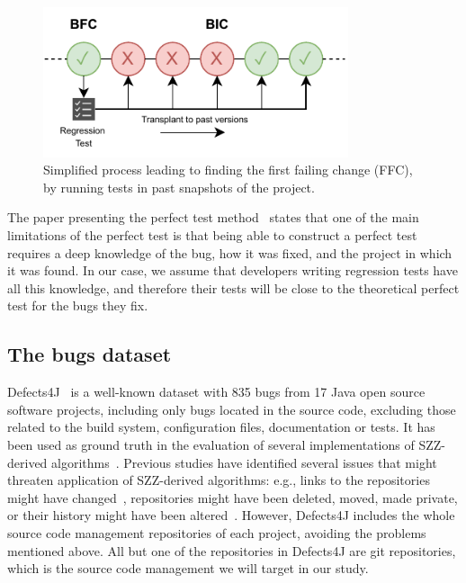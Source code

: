 \begin{figure}[h!]
  \centering    
  \includegraphics[width=0.8\textwidth]{pages/03-BugHunter/images/Model.pdf}
  \vspace{-0.5cm}
  \caption{Simplified process leading to finding the first failing change (FFC), by running tests in past snapshots of the project.
  }
  \label{fig:process}
  \vspace{-0.5cm}
\end{figure}

The paper presenting the perfect test method~\cite{rodriguez2020bugs} states that one of the main limitations of the perfect test is that being able to construct a perfect test requires a deep knowledge of the bug, how it was fixed, and the project in which it was found. 
In our case, we assume that developers writing regression tests have all this knowledge, and therefore their tests will be close to the theoretical perfect test for the bugs they fix.


\subsection{The bugs dataset}
\label{subsec:dataset}

Defects4J~\cite{just2014defects4j} is a well-known dataset with 835 bugs from 17 Java open source software projects, including only bugs located in the source code, excluding those related to the build system, configuration files, documentation or tests. It has been used as ground truth in the evaluation of several implementations of SZZ-derived algorithms~\cite{neto2019revisiting,pokropinski2022szz,wen2019exploring,an2021reducing}. 
Previous studies have identified several issues that might threaten application of SZZ-derived algorithms: e.g., links to the repositories might have  changed~\cite{lawrence2001persistence}, repositories might have been deleted, moved, made private, or their history might have been altered~\cite{bird2009:promises_perils_git}.
However, Defects4J includes the whole source code management repositories of each project, avoiding the problems mentioned above.
All but one of the repositories in Defects4J are git repositories, which is the source code management we will target in our study.

